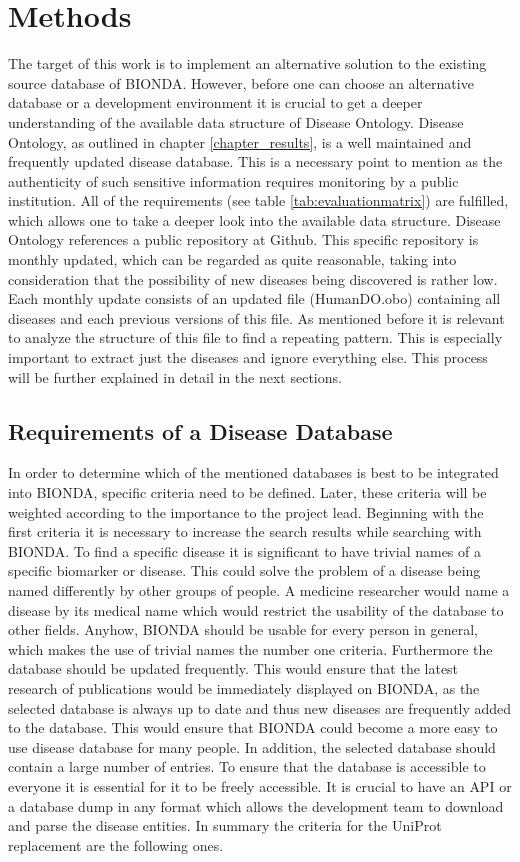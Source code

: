 \chapter{Methods}
\label{chapter_methods}
The target of this work is to implement an alternative solution to the existing source database of \ac{BIONDA}. However, before one can choose an alternative database or a development environment it is crucial to get a deeper understanding of the available data structure of Disease Ontology. Disease Ontology, as outlined in chapter \ref{chapter_results}, is a well maintained and frequently updated disease database. This is a necessary point to mention as the authenticity of such sensitive information requires monitoring by a public institution. All of the requirements (see table \ref{tab:evaluationmatrix}) are fulfilled, which allows one to take a deeper look into the available data structure. Disease Ontology references a public repository at Github. This specific repository is monthly updated, which can be regarded as quite reasonable, taking into consideration that the possibility of new diseases being discovered is rather low. Each monthly update consists of an updated file (HumanDO.obo) containing all diseases and each previous versions of this file. As mentioned before it is relevant to analyze the structure of this file to find a repeating pattern. This is especially important to extract just the diseases and ignore everything else. This process will be further explained in detail in the next sections.

\section{Requirements of a Disease Database}
In order to determine which of the mentioned databases is best to be integrated into \ac{BIONDA}, specific criteria need to be defined. Later, these criteria will be weighted according to the importance to the project lead. Beginning with the first criteria it is necessary to increase the search results while searching with \ac{BIONDA}. To find a specific disease it is significant to have trivial names of a specific biomarker or disease. This could solve the problem of a disease being named differently by other groups of people. A medicine researcher would name a disease by its medical name which would restrict the usability of the database to other fields. Anyhow, \ac{BIONDA} should be usable for every person in general, which makes the use of trivial names the number one criteria. Furthermore the database should be updated frequently. This would ensure that the latest research of publications would be immediately displayed on \ac{BIONDA}, as the selected database is always up to date and thus new diseases are frequently added to the database. This would ensure that \ac{BIONDA} could become a more easy to use disease database for many people. In addition, the selected database should contain a large number of entries. To ensure that the database is accessible to everyone it is essential for it to be freely accessible. It is crucial to have an \ac{API} or a database dump in any format which allows the development team to download and parse the disease entities. In summary the criteria for the \ac{UniProt} replacement are the following ones.

